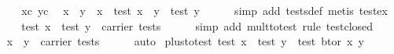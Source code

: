 \begin{isabellebody}
%
\isadelimproof
%
\endisadelimproof
%
\isatagproof
{}\isamarkupfalse%
\ {}\isanewline
\ \ \isamarkupfalse%
\ xc\ yc\ \isamarkupfalse%
\ x{}\ \ y{}\ \ {}x\ {}\ test\ x{}{}\ \ {}y\ {}\ test\ y{}{}\isanewline
\ \ \ \ \isamarkupfalse%
\ {}simp\ add{}\ tests{}def{}\ metis\ test{}ex{}\isanewline
\ \ \isamarkupfalse%
\ \isamarkupfalse%
\ {}test\ x{}\ {}\ test\ y{}\ {}\ carrier\ tests{}\isanewline
\ \ \ \ \isamarkupfalse%
\ {}simp\ add{}\ mult{}to{}test{}\ rule\ test{}closed{}\isanewline
\ \ \isamarkupfalse%
\ \isamarkupfalse%
\ {}x\ {}\ y\ {}\ carrier\ tests{}\isanewline
\ \ \ \ \isamarkupfalse%
\ auto\isanewline
{}\isamarkupfalse%
%
\endisatagproof
{\isafoldproof}%
%
\isadelimproof
\isanewline
%
\endisadelimproof
\isanewline
{}\isamarkupfalse%
\ plus{}to{}test{}\ {}test\ x\ {}\ test\ y\ {}\ test\ {}bt{}or\ x\ y{}{}\isanewline

\end{isabellebody}
